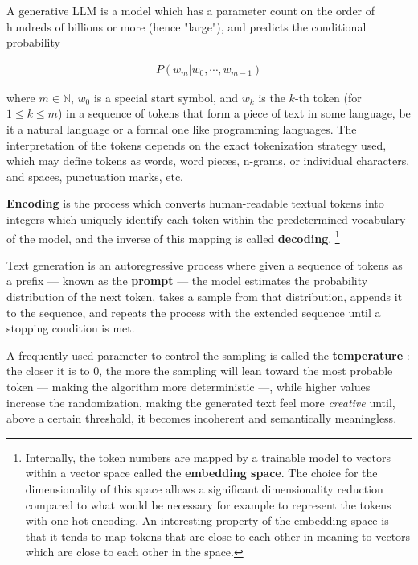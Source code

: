 \documentclass[UTF8,noindent,nohyp,parspace,titlepage,twoside,12pt]{article}
\begin{document}
      A generative LLM is a model which has a parameter count on the order of
      hundreds of billions or more (hence "large"), and predicts the conditional
      probability \cite{llms}

      \begin{align} \label{eqautoreg}
        P(w_m | w_0, \cdots, w_{m-1})
      \end{align}

      where $m \in \mathbb{N}$, $w_0$ is a special start symbol, and $w_k$ is
      the $k$-th token (for $1 \le k \le m$) in a sequence of tokens that form
      a piece of text in some language, be it a natural language or a formal
      one like programming languages. The interpretation of the tokens depends
      on the exact tokenization strategy used, which may define tokens as
      words, word pieces, n-grams, or individual characters, and spaces,
      punctuation marks, etc.

      \textbf{Encoding} is the process which converts human-readable textual
      tokens into integers which uniquely identify each token within the
      predetermined vocabulary of the model, and the inverse of this mapping
      is called \textbf{decoding}. \footnote{Internally, the token numbers are
      mapped by a trainable model to vectors within a vector space called the
      \textbf{embedding space}. The choice for the dimensionality of this space
      allows a significant dimensionality reduction compared to what would be
      necessary for example to represent the tokens with one-hot encoding. An
      interesting property of the embedding space is that it tends to map
      tokens that are close to each other in meaning to vectors which are close
      to each other in the space.}

      Text generation is an autoregressive process where given a
      sequence of tokens as a prefix --- known as the \textbf{prompt} --- the
      model estimates the probability distribution of the next token, takes a
      sample from that distribution, appends it to the sequence, and repeats
      the process with the extended sequence until a stopping condition is met.

      A frequently used parameter to control the sampling is called the
      \textbf{temperature} \cite{temperature}: the closer it is to 0, the more
      the sampling will lean toward the most probable token --- making the
      algorithm more deterministic ---, while higher values increase the
      randomization, making the generated text feel more \emph{creative} until,
      above a certain threshold, it becomes incoherent and semantically
      meaningless.
\end{document}
